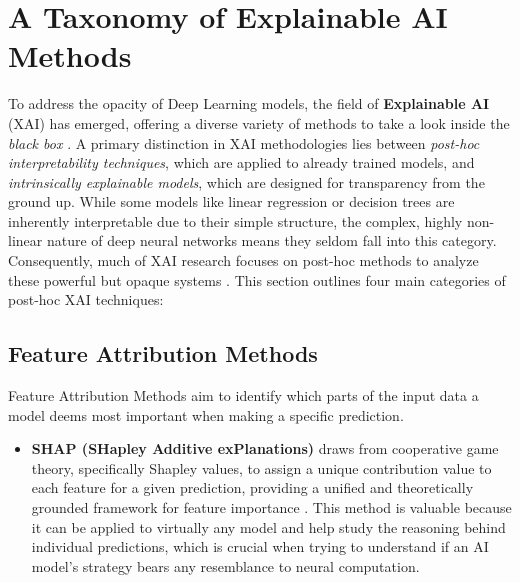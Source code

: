 \section{A Taxonomy of Explainable AI Methods}\label{sec:XAI-tax}

To address the opacity of Deep Learning models, the field of \textbf{Explainable AI} (XAI) has emerged, offering a diverse variety of methods to take a look inside the \textit{black box} \cite{doshi2017towards, miller2019explanation}. A primary distinction in XAI methodologies lies between \textit{post-hoc interpretability techniques}, which are applied to already trained models, and \textit{intrinsically explainable models}, which are designed for transparency from the ground up. While some models like linear regression or decision trees are inherently interpretable due to their simple structure, the complex, highly non-linear nature of deep neural networks means they seldom fall into this category. Consequently, much of XAI research focuses on post-hoc methods to analyze these powerful but opaque systems \cite{doshi2017towards}. This section outlines four main categories of post-hoc XAI techniques:

\subsection{Feature Attribution Methods}
Feature Attribution Methods aim to identify which parts of the input data a model deems most important when making a specific prediction.
\begin{itemize}
    \item \textbf{SHAP (SHapley Additive exPlanations)} draws from cooperative game theory, specifically Shapley values, to assign a unique contribution value to each feature for a given prediction, providing a unified and theoretically grounded framework for feature importance \cite{lundberg2017unified}. This method is valuable because it can be applied to virtually any model and help study the reasoning behind individual predictions, which is crucial when trying to understand if an AI model's strategy bears any resemblance to neural computation.
\end{itemize}

